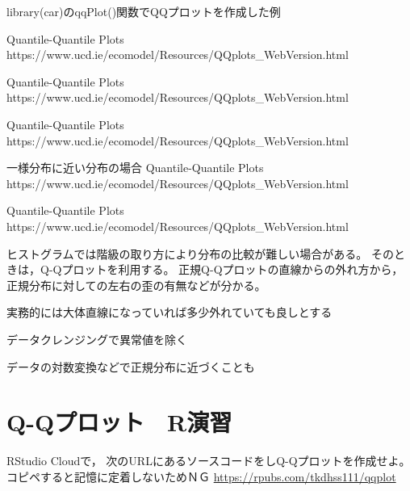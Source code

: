 {
}

{
  library(car)のqqPlot()関数でQQプロットを作成した例\\[3mm]

}


{
  \MyRef
  {Quantile-Quantile Plots}
  {https://www.ucd.ie/ecomodel/Resources/QQplots_WebVersion.html}
}

{
  \MyRef
  {Quantile-Quantile Plots}
  {https://www.ucd.ie/ecomodel/Resources/QQplots_WebVersion.html}
}

{
  \MyRef
  {Quantile-Quantile Plots}
  {https://www.ucd.ie/ecomodel/Resources/QQplots_WebVersion.html}
}

{
  一様分布に近い分布の場合
  \MyRef
  {Quantile-Quantile Plots}
  {https://www.ucd.ie/ecomodel/Resources/QQplots_WebVersion.html}
}

{
  \MyRef
  {Quantile-Quantile Plots}
  {https://www.ucd.ie/ecomodel/Resources/QQplots_WebVersion.html}
}

{
  ヒストグラムでは階級の取り方により分布の比較が難しい場合がある。
  そのときは，Q-Qプロットを利用する。
  正規Q-Qプロットの直線からの外れ方から，
  正規分布に対しての左右の歪の有無などが分かる。
  \MyItems
  {
    \item 実務的には大体直線になっていれば多少外れていても良しとする
    \item データクレンジングで異常値を除く
    \item データの対数変換などで正規分布に近づくことも
  }
}

\section{Q-Qプロット　R演習}

\MyFrame{\insertsection}
{
  RStudio Cloudで，
  次のURLにあるソースコードをしQ-Qプロットを作成せよ。
  \alert{コピペすると記憶に定着しないためＮＧ}
  \url{https://rpubs.com/tkdhss111/qqplot}
}

